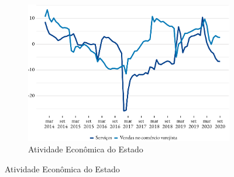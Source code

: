 \begin{figure}[!h]
	\begin{subfigure}{\linewidth}
		\caption{Atividade Econômica do Estado}
		\label{fig:pmc}
		\includegraphics{fig/pmc_ibge-1.pdf}
	\end{subfigure}
\end{figure}
